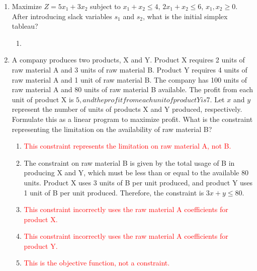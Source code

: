 \documentclass{article}%
\newcommand{\incorrect}[1]{\textcolor{red}{#1}}
\begin{document}
\begin{enumerate}
\begin{enumerate}%
\item \incorrect{This constraint represents the limitation on flour, not eggs.}%
\item Each cake uses 1 egg, and each cookie uses 0.25 eggs. The total number of eggs used cannot exceed 20, so the constraint is $c + 0.25k \le 20$.%
\item \incorrect{This constraint is incorrect; it uses the amount of flour for cookies incorrectly.}%
\item \incorrect{This inequality should be less than or equal to, not greater than or equal to.}%
\item \incorrect{This inequality should be less than or equal to, not greater than or equal to.}%
\end{enumerate}%
\vspace{1em}%
\item Maximize $Z = 5x_1 + 3x_2$ subject to $x_1 + x_2 \le 4$, $2x_1 + x_2 \le 6$, $x_1, x_2 \ge 0$. After introducing slack variables $s_1$ and $s_2$, what is the initial simplex tableau?%
\begin{enumerate}%
\item \incorrect{}%
\end{enumerate}%
\vspace{1em}%
\item A company produces two products, X and Y. Product X requires 2 units of raw material A and 3 units of raw material B. Product Y requires 4 units of raw material A and 1 unit of raw material B. The company has 100 units of raw material A and 80 units of raw material B available. The profit from each unit of product X is $5, and the profit from each unit of product Y is $7. Let $x$ and $y$ represent the number of units of products X and Y produced, respectively. Formulate this as a linear program to maximize profit. What is the constraint representing the limitation on the availability of raw material B?%
\begin{enumerate}%
\item \incorrect{This constraint represents the limitation on raw material A, not B.}%
\item The constraint on raw material B is given by the total usage of B in producing X and Y, which must be less than or equal to the available 80 units.  Product X uses 3 units of B per unit produced, and product Y uses 1 unit of B per unit produced. Therefore, the constraint is $3x + y \le 80$.%
\item \incorrect{This constraint incorrectly uses the raw material A coefficients for product X.}%
\item \incorrect{This constraint incorrectly uses the raw material A coefficients for product Y.}%
\item \incorrect{This is the objective function, not a constraint.}%
\end{enumerate}%
\vspace{1em}%
\end{enumerate}

%
\end{document}
